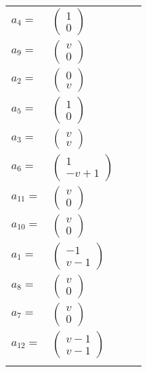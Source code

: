 \documentclass[1p]{elsarticle_modified}
\theoremstyle{definition}
\begin{document}
\begin{tabular}{m{7pt} m{180pt} m{7pt} m{180pt} }
\flushright $a_{4}=$&$\begin{pmatrix}1\\0\end{pmatrix}$ \\
\flushright $a_{9}=$&$\begin{pmatrix}v\\0\end{pmatrix}$ \\
\flushright $a_{2}=$&$\begin{pmatrix}0\\v\end{pmatrix}$ \\
\flushright $a_{5}=$&$\begin{pmatrix}1\\0\end{pmatrix}$ \\
\flushright $a_{3}=$&$\begin{pmatrix}v\\v\end{pmatrix}$ \\
\flushright $a_{6}=$&$\begin{pmatrix}1\\- v+1\end{pmatrix}$ \\
\flushright $a_{11}=$&$\begin{pmatrix}v\\0\end{pmatrix}$ \\
\flushright $a_{10}=$&$\begin{pmatrix}v\\0\end{pmatrix}$ \\
\flushright $a_{1}=$&$\begin{pmatrix}-1\\v-1\end{pmatrix}$ \\
\flushright $a_{8}=$&$\begin{pmatrix}v\\0\end{pmatrix}$ \\
\flushright $a_{7}=$&$\begin{pmatrix}v\\0\end{pmatrix}$ \\
\flushright $a_{12}=$&$\begin{pmatrix}v-1\\v-1\end{pmatrix}$\\&\end{tabular}
\end{document}

